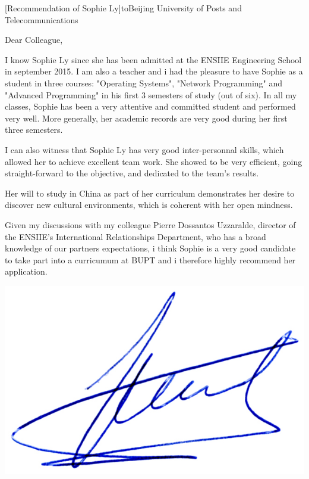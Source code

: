 \documentclass[a4paper,10pt]{article}
\begin{document}

\begin{letter}[Recommendation of Sophie Ly]{to}{Beijing University of
    Posts and Telecommunications}

Dear Colleague, 

I know Sophie Ly since she has been admitted at the ENSIIE Engineering School in
september 2015.  I am also a teacher and  i had the pleasure to have Sophie as a
student  in  three  courses:  "Operating  Systems",  "Network  Programming"  and
"Advanced Programming" in his first 3 semesters of study (out of six). In all my
classes, Sophie  has been a very  attentive and committed student  and performed
very well.  More generally, her academic  records are very good during her first
three semesters.

I can also witness that Sophie Ly has very good inter-personnal skills, which
allowed her to achieve excellent team work. She showed to be very efficient,
going straight-forward to the objective, and dedicated to the team's results.

Her will to  study in China as  part of her curriculum demonstrates her desire to
discover new cultural environments, which is coherent with her open mindness.

Given my discussions with my colleague Pierre Dossantos Uzzaralde, director of
the ENSIIE's International Relationships Department, who has a broad knowledge
of our partners expectations, i think Sophie is a very good candidate to take
part into a curricumum at BUPT and i therefore highly recommend her application.

\end{letter}
\begin{flushright}
\includegraphics[width=.26\textwidth]{signgenaud.jpg}
\end{flushright}
%
%
\end{document}
